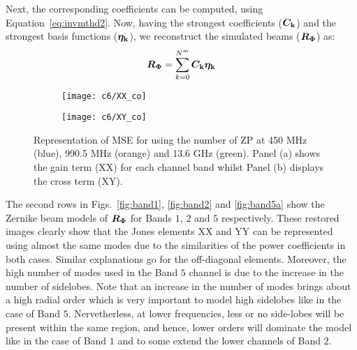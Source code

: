 Next, the corresponding coefficients can be computed, using Equation~\ref{eq:invmthd2}. Now, having the strongest coefficients ($\boldsymbol{C_{\rm k}}$) and the strongest basis functions ($\boldsymbol{\eta_{\rm k}}$), we reconstruct the simulated beams ($\boldsymbol{R_{\rm \Phi}}$) as:
\begin{equation}\label{eq:R}
\boldsymbol{R_{\rm \Phi}} = \sum\limits_{k=0}^{N^m} \boldsymbol{C_{\rm k} \eta_{\rm k}}
\end{equation}


\begin{figure}
\centering
 \begin{minipage}[H]{\linewidth}
\begin{subfigure}[b]{0.8\textwidth}
      \texttt{[image: c6/XX\_co]} %
                \caption{}
                \label{fig:xx}
        \end{subfigure}
        \qquad
        \begin{subfigure}[b]{0.8\textwidth}
         \texttt{[image: c6/XY\_co]} %
                \caption{}
               \label{fig:xy}
        \end{subfigure}
         \end{minipage}
    \caption{Representation of MSE for using the number of ZP at 450 MHz (blue), 990.5 MHz (orange) and 13.6 GHz (green).
    Panel (a) shows the gain term (XX) for each channel band whilst Panel (b) displays the cross term (XY). }
	    \label{fig:nmodes}
  \end{figure}
  \FloatBarrier

\noindent The second rows in Figs.~\ref{fig:band1}, \ref{fig:band2} and \ref{fig:band5a} show the Zernike beam models of $\boldsymbol{R_{\rm \Phi}}$ for Bands $1$, $2$ and $5$ respectively. These restored images clearly show that the Jones elements XX and YY can be represented using almost the same modes due to the similarities of the power coefficients in both cases. Similar explanations go for the off-diagonal elements. Moreover, the high number of modes used in the Band $5$ channel is due to the increase in the number of sidelobes. Note that an increase in the number of modes brings about a high radial order which is very important to model high sidelobes like in the case of Band $5$. Nervetherless, at lower frequencies, less or no side-lobes will be present within the same region, and hence, lower orders will dominate the model like in the case of Band $1$ and to some extend the lower channels of Band $2$.

